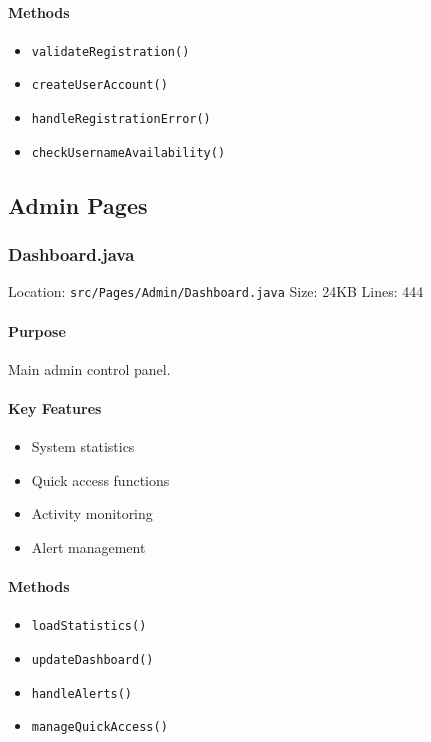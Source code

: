 \documentclass[12pt,a4paper]{article}
\begin{document}
\paragraph{Methods}
\begin{itemize}
    \item \texttt{validateRegistration()}
    \item \texttt{createUserAccount()}
    \item \texttt{handleRegistrationError()}
    \item \texttt{checkUsernameAvailability()}
\end{itemize}

\subsection{Admin Pages}
\subsubsection{Dashboard.java}
Location: \texttt{src/Pages/Admin/Dashboard.java}
Size: 24KB
Lines: 444

\paragraph{Purpose}
Main admin control panel.

\paragraph{Key Features}
\begin{itemize}
    \item System statistics
    \item Quick access functions
    \item Activity monitoring
    \item Alert management
\end{itemize}

\paragraph{Methods}
\begin{itemize}
    \item \texttt{loadStatistics()}
    \item \texttt{updateDashboard()}
    \item \texttt{handleAlerts()}
    \item \texttt{manageQuickAccess()}
\end{itemize}
\end{document}
